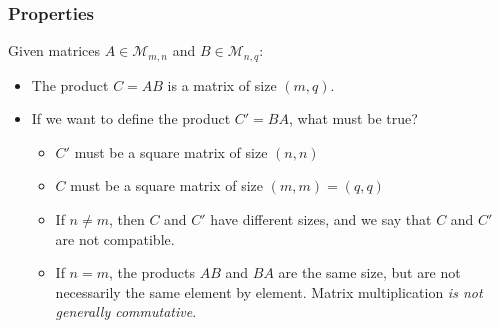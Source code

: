 \documentclass[usenames,dvipsnames,aspectratio=169,10pt]{beamer}
\numberwithin{equation}{section}
\begin{document}
\begin{frame}
\frametitle{Properties}
Given matrices $A\in\mathcal{M}_{m,n}$ and $B\in\mathcal{M}_{n,q}$:
\begin{itemize}
\item The product $C=AB$ is a matrix of size $(m,q)$.

\item If we want to define the product $C'=BA$, what must be true?
	\begin{itemize}
	\item $C'$ must be a square matrix of size $(n,n)$
	\item $C$ must be a square matrix of size $(m,m)=(q,q)$
	\item If $n \neq m$, then $C$ and $C'$ have different sizes, and we say that $C$ and $C'$ are not compatible.
	\item If $n = m$, the products $AB$ and $BA$ are the same size, but are not necessarily the same element by element. Matrix multiplication \textit{is not generally commutative}.
	\end{itemize}
\end{itemize}
\end{frame}
\end{document}
